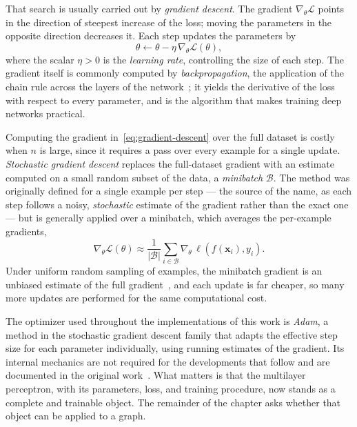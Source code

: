 That search is usually carried out by \textit{gradient descent}. The gradient
$\nabla_\theta \mathcal{L}$ points in the direction of steepest increase of the
loss; moving the parameters in the opposite direction decreases it. Each step
updates the parameters by
\begin{equation}
  \theta \leftarrow \theta - \eta \, \nabla_\theta \mathcal{L}(\theta),
  \label{eq:gradient-descent}
\end{equation}
where the scalar $\eta > 0$ is the \textit{learning rate}, controlling the size
of each step. The gradient itself is commonly computed by
\textit{backpropagation}, the application of the chain rule across the layers of the
network~\cite{bishop2024}; it yields the derivative of the loss with
respect to every parameter, and is the algorithm that makes training deep
networks practical.
 
Computing the gradient in~\eqref{eq:gradient-descent} over the full dataset is
costly when $n$ is large, since it requires a pass over every example for a
single update. \textit{Stochastic gradient descent} replaces the full-dataset
gradient with an estimate computed on a small random subset of the data, a
\textit{minibatch} $\mathcal{B}$. The method was originally defined for a single
example per step — the source of the name, as each step follows a noisy,
\textit{stochastic} estimate of the gradient rather than the exact one — but is
generally applied over a minibatch, which averages the per-example gradients,
\begin{equation}
  \nabla_\theta \mathcal{L}(\theta) \approx
    \frac{1}{\lvert \mathcal{B} \rvert} \sum_{i \in \mathcal{B}}
    \nabla_\theta \, \ell\!\left(f(\mathbf{x}_i), y_i\right).
  \label{eq:sgd}
\end{equation}
Under uniform random sampling of examples, the minibatch gradient is an 
unbiased estimate of the full gradient~\cite{goodfellow2016}, and each update 
is far cheaper, so many more updates are performed for the same 
computational cost. 
 
The optimizer used throughout the implementations of this work is
\textit{Adam}, a method in the stochastic gradient descent
family that adapts the effective step size for each parameter individually,
using running estimates of the gradient. Its internal mechanics are not required for the
developments that follow and are documented in the original work~\cite{kingma2015}.
What matters is that the multilayer perceptron, with its parameters, loss, and training
procedure, now stands as a complete and trainable object. The remainder of the
chapter asks whether that object can be applied to a graph.

